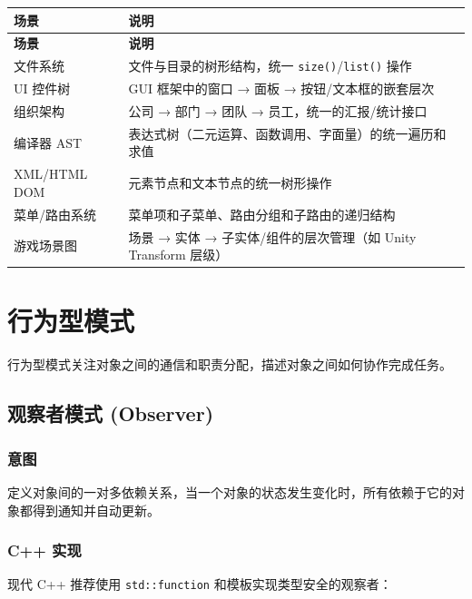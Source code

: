 \documentclass[12pt,a4paper,fontset=fandol]{ctexbook}
\begin{document}
\begin{longtable}{p{4.5cm} p{8.5cm}}
\toprule
\textbf{场景} & \textbf{说明} \\
\midrule
\endfirsthead
\toprule
\textbf{场景} & \textbf{说明} \\
\midrule
\endhead
\bottomrule
\endfoot
文件系统 & 文件与目录的树形结构，统一 \texttt{size()}/\allowbreak{}\texttt{list()} 操作 \\
UI 控件树 & GUI 框架中的窗口 → 面板 → 按钮/文本框的嵌套层次 \\
组织架构 & 公司 → 部门 → 团队 → 员工，统一的汇报/统计接口 \\
编译器 AST & 表达式树（二元运算、函数调用、字面量）的统一遍历和求值 \\
XML/HTML DOM & 元素节点和文本节点的统一树形操作 \\
菜单/路由系统 & 菜单项和子菜单、路由分组和子路由的递归结构 \\
游戏场景图 & 场景 → 实体 → 子实体/组件的层次管理（如 Unity Transform 层级） \\
\end{longtable}

\part{行为型模式}

行为型模式关注对象之间的通信和职责分配，描述对象之间如何协作完成任务。

\chapter{观察者模式 (Observer)}

\section{意图}

定义对象间的一对多依赖关系，当一个对象的状态发生变化时，所有依赖于它的对象都得到通知并自动更新。

\section{C++ 实现}

现代 C++ 推荐使用 \texttt{std::function} 和模板实现类型安全的观察者：
\end{document}
